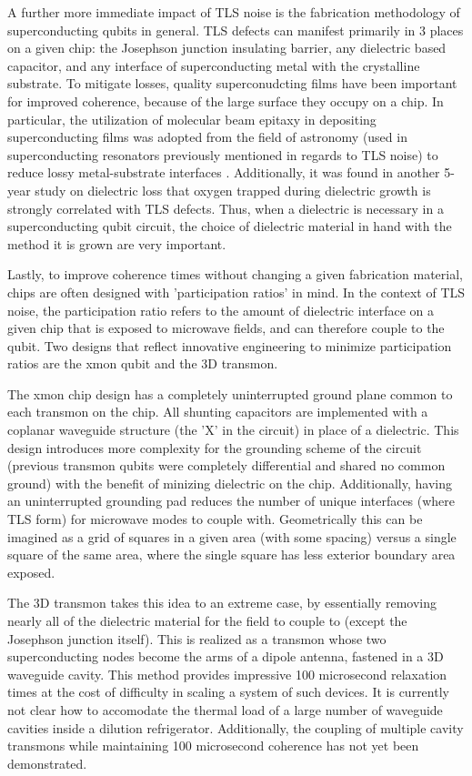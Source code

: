 \documentclass[%
 reprint,
showpacs,
 amsmath,amssymb,
 aps,
longbibliography,
]{revtex4-1}
\begin{document}
A further more immediate impact of TLS noise is the fabrication methodology of superconducting qubits in general. TLS defects can manifest primarily in 3 places on a given chip: the Josephson junction insulating barrier, any dielectric based capacitor, and any interface of superconducting metal with the crystalline substrate. To mitigate losses, quality superconudcting films have been important for improved coherence, because of the large surface they occupy on a chip. In particular, the utilization of molecular beam epitaxy in depositing superconducting films was adopted from the field of astronomy (used in superconducting resonators previously mentioned in regards to TLS noise) to reduce lossy metal-substrate interfaces \cite{MBE}. Additionally, it was found in another 5-year study on dielectric loss \cite{UCSB2015_decoherence} that oxygen trapped during dielectric growth is strongly correlated with TLS defects. Thus, when a dielectric is necessary in a superconducting qubit circuit, the choice of dielectric material in hand with the method it is grown are very important.

Lastly, to improve coherence times without changing a given fabrication material, chips are often designed with 'participation ratios' in mind.
In the context of TLS noise, the participation ratio refers to the amount of dielectric interface on a given chip that is exposed to microwave fields, and can therefore couple to the qubit. Two designs that reflect innovative engineering to minimize participation ratios are the xmon qubit\cite{xmon} and the 3D transmon\cite{3dtransmon}.

The xmon chip design has a completely uninterrupted ground plane common to each transmon on the chip. All shunting capacitors are implemented with a coplanar waveguide structure (the 'X' in the circuit) in place of a dielectric. This design introduces more complexity for the grounding scheme of the circuit (previous transmon qubits were completely differential and shared no common ground) with the benefit of minizing dielectric on the chip. Additionally, having an uninterrupted grounding pad reduces the number of unique interfaces (where TLS form) for microwave modes to couple with. Geometrically this can be imagined as a grid of squares in a given area (with some spacing) versus a single square of the same area, where the single square has less exterior boundary area exposed.

The 3D transmon takes this idea to an extreme case, by essentially removing nearly all of the dielectric material for the field to couple to (except the Josephson junction itself). This is realized as a transmon whose two superconducting nodes become the arms of a dipole antenna, fastened in a 3D waveguide cavity. This method provides impressive 100 microsecond relaxation times at the cost of difficulty in scaling a system of such devices. It is currently not clear how to accomodate the thermal load of a large number of waveguide cavities inside a dilution refrigerator. Additionally, the coupling of multiple cavity transmons while maintaining 100 microsecond coherence has not yet been demonstrated.
\end{document}
